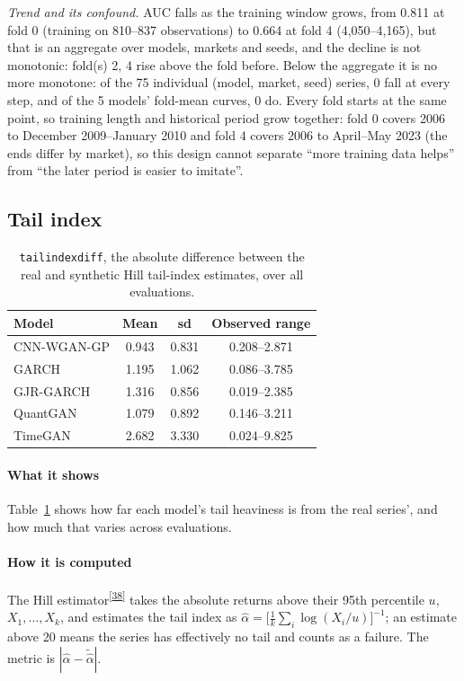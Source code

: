 \documentclass[11pt,a4paper]{article}
\makeatletter
\newcommand{\tcite}[1]{\textsuperscript{[\hyperlink{R:#1}{#1}]}}
\DeclareRobustCommand{\_}{\ifmmode\nfss@text{\textunderscore}\else\textunderscore\allowbreak\fi}
\makeatother
\begin{document}
\emph{Trend and its confound.} AUC falls as the training window grows, from 0.811 at fold 0 (training on 810--837 observations) to 0.664 at fold 4 (4,050--4,165), but that is an aggregate over models, markets and seeds, and the decline is not monotonic: fold(s) 2, 4 rise above the fold before. Below the aggregate it is no more monotone: of the 75 individual (model, market, seed) series, 0 fall at every step, and of the 5 models' fold-mean curves, 0 do. Every fold starts at the same point, so training length and historical period grow together: fold 0 covers 2006 to December 2009--January 2010 and fold 4 covers 2006 to April--May 2023 (the ends differ by market), so this design cannot separate ``more training data helps'' from ``the later period is easier to imitate''.

\subsection{Tail index}
\label{sec:tail}

\begin{table}[htbp]
\centering
\caption{\texttt{tail\_index\_diff}, the absolute difference between the real and synthetic Hill tail-index estimates, over all evaluations.}
\label{tab:tail}
\begin{tabular}{@{}lccc@{}}
\toprule
Model & Mean & sd & Observed range \\
\midrule
CNN-WGAN-GP & 0.943 & 0.831 & 0.208--2.871 \\
GARCH & 1.195 & 1.062 & 0.086--3.785 \\
GJR-GARCH & 1.316 & 0.856 & 0.019--2.385 \\
QuantGAN & 1.079 & 0.892 & 0.146--3.211 \\
TimeGAN & 2.682 & 3.330 & 0.024--9.825 \\
\bottomrule
\end{tabular}
\end{table}

\paragraph{What it shows} Table~\ref{tab:tail} shows how far each model's tail heaviness is from the real series', and how much that varies across evaluations.

\paragraph{How it is computed} The Hill estimator\tcite{38} takes the absolute returns above their 95th percentile $u$, $X_1,\dots,X_k$, and estimates the tail index as $\hat\alpha=\big[\frac1k\sum_i\log(X_i/u)\big]^{-1}$; an estimate above 20 means the series has effectively no tail and counts as a failure. The metric is $|\hat\alpha-\tilde{\hat\alpha}|$.
\end{document}

